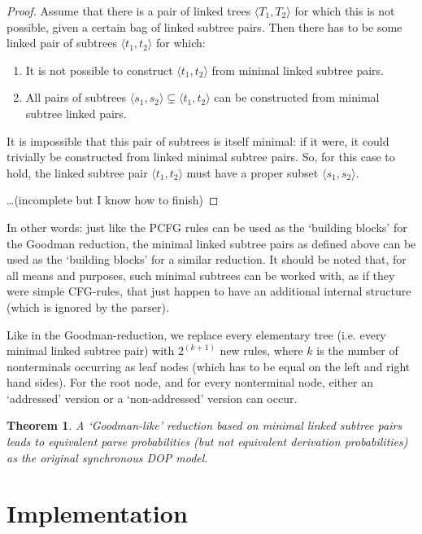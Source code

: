 \documentclass[a4paper]{article}
\newtheorem{theorem}{Theorem}[section]
\theoremstyle{definition}
\begin{document}
\begin{proof}
Assume that there is a pair of linked trees $\langle T_1, T_2 \rangle$ for which this is not possible, given a certain bag of linked subtree pairs. Then there has to be some linked pair of subtrees $\langle t_1, t_2 \rangle$ for which:
\begin{enumerate}
\item It is not possible to construct $\langle t_1, t_2 \rangle$ from minimal linked subtree pairs.
\item All pairs of subtrees $\langle s_1, s_2 \rangle \subsetneq \langle t_1, t_2 \rangle$ can be constructed from minimal subtree linked pairs.
\end{enumerate}
It is impossible that this pair of subtrees is itself minimal: if it were, it could trivially be constructed from linked minimal subtree pairs. So, for this case to hold, the linked subtree pair $\langle t_1, t_2 \rangle$ must have a proper subset $\langle s_1, s_2 \rangle$.

\ldots (incomplete but I know how to finish)
\end{proof}

In other words: just like the PCFG rules can be used as the `building blocks' for the Goodman reduction, the minimal linked subtree pairs as defined above can be used as the `building blocks' for a similar reduction. It should be noted that, for all means and purposes, such minimal subtrees can be worked with, as if they were simple CFG-rules, that just happen to have an additional internal structure (which is ignored by the parser).

Like in the Goodman-reduction, we replace every elementary tree (i.e. every minimal linked subtree pair) with $2^{(k+1)}$ new rules, where $k$ is the number of nonterminals occurring as leaf nodes (which has to be equal on the left and right hand sides). For the root node, and for every nonterminal node, either an `addressed' version or a `non-addressed' version can occur.

\begin{theorem}
A `Goodman-like' reduction based on minimal linked subtree pairs leads to equivalent parse probabilities (but not equivalent derivation probabilities) as the original synchronous DOP model.
\end{theorem}

\section{Implementation}
\end{document}
